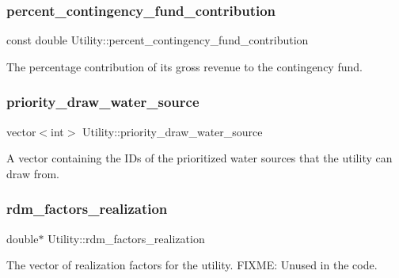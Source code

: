 \subsubsection{\texorpdfstring{percent\+\_\+contingency\+\_\+fund\+\_\+contribution}{percent\_contingency\_fund\_contribution}}
{\footnotesize\ttfamily const double Utility\+::percent\+\_\+contingency\+\_\+fund\+\_\+contribution}



The percentage contribution of its gross revenue to the contingency fund. 

\mbox{\label{classUtility_aee22e0941d0116dffa927afac2fd17f9}} 
\subsubsection{\texorpdfstring{priority\+\_\+draw\+\_\+water\+\_\+source}{priority\_draw\_water\_source}}
{\footnotesize\ttfamily vector$<$int$>$ Utility\+::priority\+\_\+draw\+\_\+water\+\_\+source\hspace{0.3cm}{\ttfamily [private]}}



A vector containing the I\+Ds of the prioritized water sources that the utility can draw from. 

\mbox{\label{classUtility_a9888a401fb708200eb282799583762c9}} 
\subsubsection{\texorpdfstring{rdm\+\_\+factors\+\_\+realization}{rdm\_factors\_realization}}
{\footnotesize\ttfamily double$\ast$ Utility\+::rdm\+\_\+factors\+\_\+realization\hspace{0.3cm}{\ttfamily [private]}}



The vector of realization factors for the utility. F\+I\+X\+ME\+: Unused in the code. 

\mbox{\label{classUtility_aa78701b34a33088dfe3677eca579617e}} 
